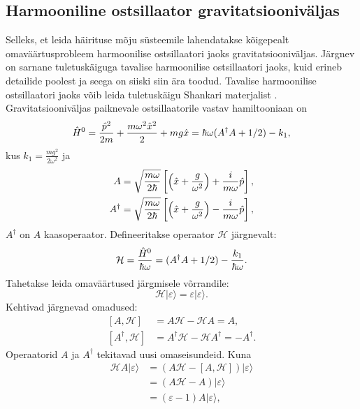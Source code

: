 \documentclass{trkut}%
\renewcommand\ket[1]{{|{#1}\rangle}}
\begin{document}
\subsection{Harmooniline ostsillaator gravitatsiooniväljas}

Selleks, et leida häirituse mõju süsteemile lahendatakse kõigepealt omaväärtusprobleem harmoonilise ostsillaatori jaoks gravitatsiooniväljas.
Järgnev on sarnane tuletuskäiguga tavalise harmoonilise ostsillaatori jaoks, kuid erineb detailide poolest ja seega on siiski siin ära toodud.
Tavalise harmoonilise ostsillaatori jaoks võib leida tuletuskäigu Shankari materjalist \parencite[202-216]{shankar94}.
Gravitatsiooniväljas paiknevale ostsillaatorile vastav hamiltooniaan on
\begin{equation}
    \op[0]{H}=\frac{\op{p}^2}{2m}+\frac{m\omega^2 \op{x}^2}{2} + mg\op{x}=\hbar \omega (A^\dagger A + 1/2)-k_1,
\end{equation}
kus $k_1=\frac{mg^2}{2\omega^2}$ ja
\begin{align}
    \begin{split}
        A &= \sqrt{\frac{m\omega}{2\hbar}}\left[ \left( \op{x} + \frac{g}{\omega^2} \right) + \frac{i}{m\omega} \op{p} \right], \\
        A^\dagger &= \sqrt{\frac{m\omega}{2\hbar}}\left[ \left( \op{x} + \frac{g}{\omega^2} \right) - \frac{i}{m\omega} \op{p} \right],
    \end{split}
\end{align}
$A^\dagger$ on $A$ kaasoperaator.
Defineeritakse operaator $\mathcal{H}$ järgnevalt:
\begin{equation}
    \mathcal{H} = \frac{\op[0]{H}}{\hbar \omega}=(A^\dagger A + 1/2)-\frac{k_1}{\hbar \omega}.
    \label{mathcalH}
\end{equation}
Tahetakse leida omaväärtused järgmisele võrrandile:
\begin{equation}
    \mathcal{H}\ket{\varepsilon}=\varepsilon \ket{\varepsilon}.
\end{equation}
Kehtivad järgnevad omadused:
\begin{align}
    \left[A, \mathcal{H}\right] &=A\mathcal{H} - \mathcal{H}A=A, \\
    \left[A^\dagger, \mathcal{H}\right] &= A^\dagger \mathcal{H} - \mathcal{H} A^\dagger = -A^\dagger.
\end{align}
Operaatorid $A$ ja $A^\dagger$ tekitavad uusi omaseisundeid. Kuna
\begin{align}
    \mathcal{H}A\ket{\varepsilon}&=\left(A\mathcal{H}-[A, \mathcal{H}]\right)\ket{\varepsilon} \nonumber\\
    &=(A\mathcal{H}-A)\ket{\varepsilon} \nonumber\\
    &=(\varepsilon - 1)A\ket{\varepsilon},
\end{align}
\end{document}
